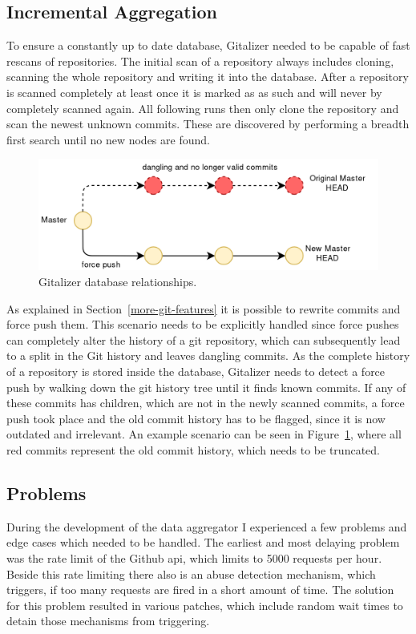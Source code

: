 \subsection{Incremental Aggregation}
To ensure a constantly up to date database, Gitalizer needed to be capable of fast rescans of repositories.
The initial scan of a repository always includes cloning, scanning the whole repository and writing it into the database.
After a repository is scanned completely at least once it is marked as as such and will never by completely scanned again.
All following runs then only clone the repository and scan the newest unknown commits.
These are discovered by performing a breadth first search until no new nodes are found.

\begin{figure}[H]
\includegraphics[scale=0.3]{./graphs/git-history-rewrite}
\centering
\caption{Gitalizer database relationships.}\label{fig:gitalizer-relationship}
\end{figure}

As explained in Section~\ref{more-git-features} it is possible to rewrite commits and force push them.
This scenario needs to be explicitly handled since force pushes can completely alter the history of a git repository, which can subsequently lead to a split in the Git history and leaves dangling commits.
As the complete history of a repository is stored inside the database, Gitalizer needs to detect a force push by walking down the git history tree until it finds known commits.
If any of these commits has children, which are not in the newly scanned commits, a force push took place and the old commit history has to be flagged, since it is now outdated and irrelevant.
An example scenario can be seen in Figure~\ref{fig:gitalizer-relationship}, where all red commits represent the old commit history, which needs to be truncated.


\subsection{Problems}
During the development of the data aggregator I experienced a few problems and edge cases which needed to be handled.
The earliest and most delaying problem was the rate limit of the Github \ac{api}, which limits to 5000 requests per hour.
Beside this rate limiting there also is an abuse detection mechanism, which triggers, if too many requests are fired in a short amount of time.
The solution for this problem resulted in various patches, which include random wait times to detain those mechanisms from triggering.

